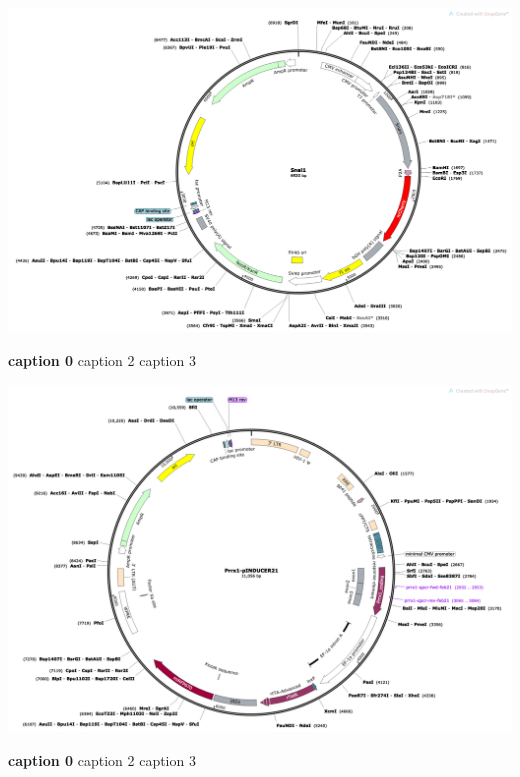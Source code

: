 \begin{suppfigure}[p]  
    \centering
    \includegraphics[width=\linewidth]{figures/hedgehog/SuppFigure12.png}
    \caption[caption1]{
        \textbf{caption 0}
        caption 2
        caption 3   
    }
    \label{fig:hh_figureS12}
\end{suppfigure}


\begin{suppfigure}[p]  
    \centering
    \includegraphics[width=\linewidth]{figures/hedgehog/SuppFigure13.png}
    \caption[caption1]{
        \textbf{caption 0}
        caption 2
        caption 3   
    }
    \label{fig:hh_figureS13}
\end{suppfigure}


